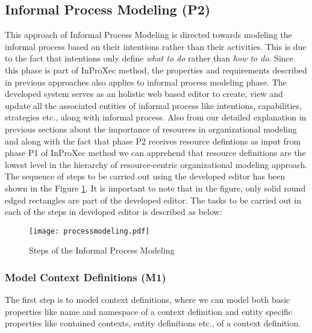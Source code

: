 \subsection{Informal Process Modeling (P2)}
\label{subsec:informalprocessmodeling}
This approach of Informal Process Modeling is directed towards modeling the informal process based on their intentions rather than their activities. This is due to the fact that intentions only define \textit{what to do} rather than \textit{how to do}. Since this phase is part of InProXec method, the properties and requirements described in previous approaches \cite{Sungur2014a,Sungur2015} also applies to informal process modeling phase. The developed system serves as an holistic web based editor to create, view and update all the associated entities of informal process like intentions, capabilities, strategies etc., along with informal process. Also from our detailed explanation in previous sections about the importance of resources in organizational modeling  and along with the fact that phase P2 receives resource defintions as input from phase P1 of InProXec method we can apprehend that resource definitions are the lowest level in the hierarchy of resource-centric organizational modeling approach. The sequence of steps to be carried out using the developed editor has been shown in the Figure  \ref{fig:processdiagram}. It is important to note that in the figure, only solid round edged rectangles are part of the developed editor. The tasks to be carried out in each of the steps in developed editor is described as below:

\begin{figure}
	\centering
	\texttt{[image: processmodeling.pdf]}
	\caption{Steps of the Informal Process Modeling}
	\label{fig:processdiagram}
\end{figure}

\subsubsection{Model Context Definitions (M1)}  
The first step is to model context definitions, where we can model both basic properties like name and namespace of a context definition and entity specific properties like contained contexts, entity definitions etc., of a context definition.  

